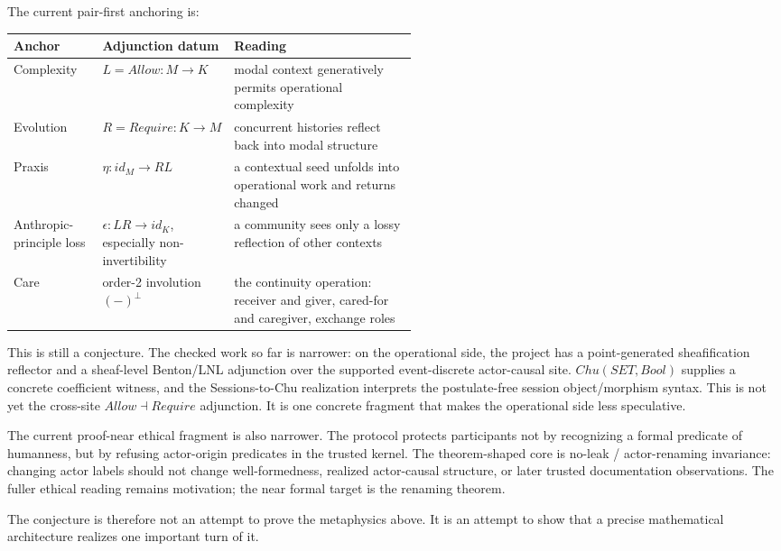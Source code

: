 \documentclass[11pt]{article}
\begin{document}
The current pair-first anchoring is:

\begin{table}[H]
\small
\setlength{\tabcolsep}{5pt}
\renewcommand{\arraystretch}{1.18}
\begin{tabularx}{\linewidth}{@{}p{0.22\linewidth}p{0.30\linewidth}Y@{}}
\toprule
Anchor & Adjunction datum & Reading \\
\midrule
Complexity & \(L = Allow : M \to K\) &
modal context generatively permits operational complexity \\
\addlinespace
Evolution & \(R = Require : K \to M\) &
concurrent histories reflect back into modal structure \\
\addlinespace
Praxis & \(\eta : id_M \to R L\) &
a contextual seed unfolds into operational work and returns changed \\
\addlinespace
Anthropic-principle loss &
\(\epsilon : L R \to id_K\), especially non-invertibility &
a community sees only a lossy reflection of other contexts \\
\addlinespace
Care & order-2 involution \((-)^\perp\) &
the continuity operation: receiver and giver, cared-for and caregiver,
exchange roles \\
\bottomrule
\end{tabularx}
\end{table}

This is still a conjecture. The checked work so far is narrower: on the
operational side, the project has a point-generated sheafification reflector
and a sheaf-level Benton/LNL adjunction over the supported event-discrete
actor-causal site. \(Chu(SET,Bool)\) supplies a concrete coefficient witness,
and the Sessions-to-Chu realization interprets the postulate-free session
object/morphism syntax. This is not yet the cross-site \(Allow \dashv Require\)
adjunction. It is one concrete fragment that makes the operational side less
speculative.

The current proof-near ethical fragment is also narrower. The protocol
protects participants not by recognizing a formal predicate of humanness, but
by refusing actor-origin predicates in the trusted kernel. The theorem-shaped
core is no-leak / actor-renaming invariance: changing actor labels should not
change well-formedness, realized actor-causal structure, or later trusted
documentation observations. The fuller ethical reading remains motivation;
the near formal target is the renaming theorem.

The conjecture is therefore not an attempt to prove the metaphysics above. It
is an attempt to show that a precise mathematical architecture realizes one
important turn of it.
\end{document}

